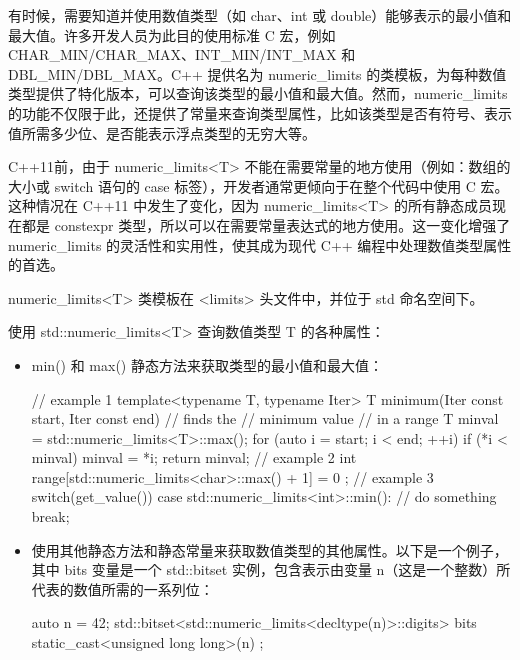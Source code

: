 
有时候，需要知道并使用数值类型（如 char、int 或 double）能够表示的最小值和最大值。许多开发人员为此目的使用标准 C 宏，例如 CHAR\_MIN/CHAR\_MAX、INT\_MIN/INT\_MAX 和 DBL\_MIN/DBL\_MAX。C++ 提供名为 numeric\_limits 的类模板，为每种数值类型提供了特化版本，可以查询该类型的最小值和最大值。然而，numeric\_limits 的功能不仅限于此，还提供了常量来查询类型属性，比如该类型是否有符号、表示值所需多少位、是否能表示浮点类型的无穷大等。

C++11前，由于 numeric\_limits<T> 不能在需要常量的地方使用（例如：数组的大小或 switch 语句的 case 标签），开发者通常更倾向于在整个代码中使用 C 宏。这种情况在 C++11 中发生了变化，因为 numeric\_limits<T> 的所有静态成员现在都是 constexpr 类型，所以可以在需要常量表达式的地方使用。这一变化增强了 numeric\_limits 的灵活性和实用性，使其成为现代 C++ 编程中处理数值类型属性的首选。


numeric\_limits<T> 类模板在 <limits> 头文件中，并位于 std 命名空间下。


使用 std::numeric\_limits<T> 查询数值类型 T 的各种属性：

\begin{itemize}
\item
min() 和 max() 静态方法来获取类型的最小值和最大值：

\begin{cpp}
// example 1
template<typename T, typename Iter>
T minimum(Iter const start, Iter const end) // finds the
// minimum value
// in a range
{
    T minval = std::numeric_limits<T>::max();
    for (auto i = start; i < end; ++i)
    {
        if (*i < minval)
        minval = *i;
    }
    return minval;
}
// example 2
int range[std::numeric_limits<char>::max() + 1] = { 0 };
// example 3
switch(get_value())
{
    case std::numeric_limits<int>::min():
    // do something
    break;
}
\end{cpp}

\item
使用其他静态方法和静态常量来获取数值类型的其他属性。以下是一个例子，其中 bits 变量是一个 std::bitset 实例，包含表示由变量 n（这是一个整数）所代表的数值所需的一系列位：

\begin{cpp}
auto n = 42;
std::bitset<std::numeric_limits<decltype(n)>::digits>
bits { static_cast<unsigned long long>(n) };
\end{cpp}
\end{itemize}

